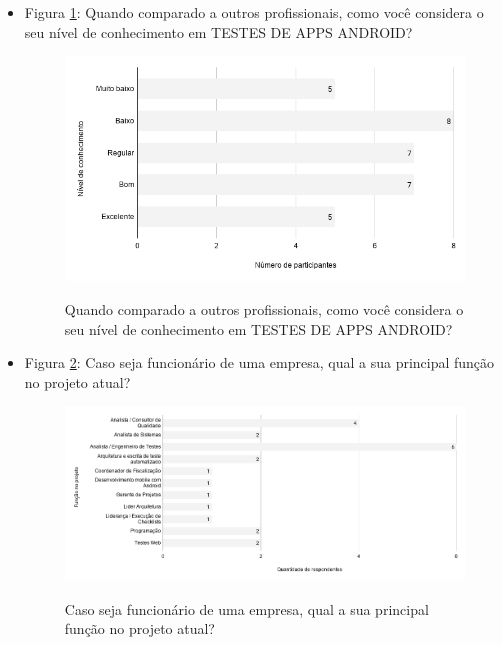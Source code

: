 \begin{itemize}
    
     \item Figura \ref{figure:s_conhecimentotestesandroid}: Quando comparado a outros profissionais, como você considera o seu nível de conhecimento em TESTES DE APPS ANDROID?
        \begin{figure}[!htb]
        \centering
        \includegraphics[width=.80\textwidth]{images/s_conhecimentotestesandroid.png}
        \label{figure:s_conhecimentotestesandroid}
        \caption{Quando comparado a outros profissionais, como você considera o seu nível de conhecimento em TESTES DE APPS ANDROID?}
        \end{figure}   
    
    
    
    \item Figura \ref{figure:s_funcaoprojeto}: Caso seja funcionário de uma empresa, qual a sua principal função no projeto atual?
        \begin{figure}[!htb]
        \centering
        \includegraphics[width=.80\textwidth]{images/s_funcaoprojeto.png}
        \label{figure:s_funcaoprojeto}
        \caption{Caso seja funcionário de uma empresa, qual a sua principal função no projeto atual?}
        \end{figure}
    

\end{itemize}

